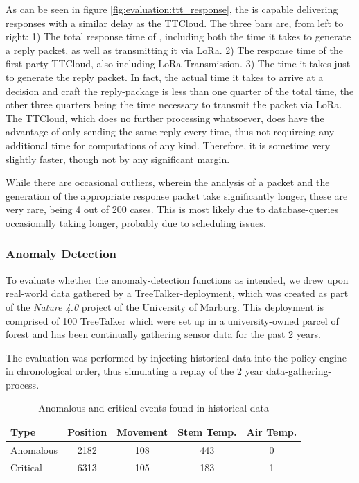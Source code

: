 As can be seen in figure \ref{fig:evaluation:ttt_response}, the \ttt is capable delivering responses with a similar delay as the TTCloud.
The three bars are, from left to right: 1) The total response time of \ttt, including both the time it takes to generate a reply packet, as well as transmitting it via LoRa. 2) The response time of the first-party TTCloud, also including LoRa Transmission. 3) The time it takes \ttt just to generate the reply packet.
In fact, the actual time it takes to arrive at a decision and craft the reply-package is less than one quarter of the total time, the other three quarters being the time necessary to transmit the packet via LoRa.
The TTCloud, which does no further processing whatsoever, does have the advantage of only sending the same reply every time, thus not requireing any additional time for computations of any kind.
Therefore, it is sometime very slightly faster, though not by any significant margin.

While there are occasional outliers, wherein the analysis of a packet and the generation of the appropriate response packet take significantly longer, these are very rare, being 4 out of 200 cases.
This is most likely due to database-queries occasionally taking longer, probably due to scheduling issues.

\subsubsection{Anomaly Detection}
\label{sec:evaluation:anomaly-detection}

To evaluate whether the anomaly-detection functions as intended, we drew upon real-world data gathered by a TreeTalker-deployment, which was created as part of the \textit{Nature 4.0} project of the University of Marburg.
This deployment is comprised of 100 TreeTalker which were set up in a university-owned parcel of forest and has been continually gathering sensor data for the past 2 years.

The evaluation was performed by injecting historical data into the policy-engine in chronological order, thus simulating a replay of the 2 year data-gathering-process.

\begin{table}[tb]
    \centering
    \caption{Anomalous and critical events found in historical data}
    \label{tab:evaluation:anomalies}
    \begin{tabular}{lcccc}
        \toprule
        Type & Position & Movement & Stem Temp. & Air Temp.  \\ \midrule
        Anomalous & 2182 & 108 & 443 & 0 \\
        Critical & 6313 & 105 & 183 & 1 \\
        \bottomrule
    \end{tabular}
\end{table}

